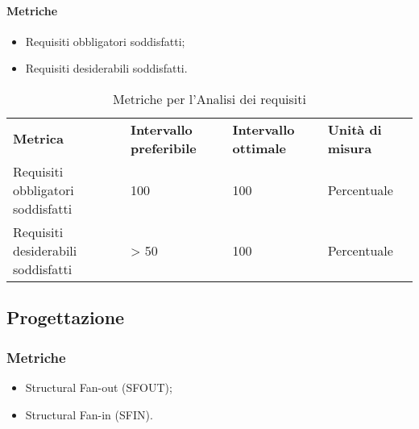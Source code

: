 \paragraph{Metriche}
\begin{itemize}
	\item Requisiti obbligatori soddisfatti;
	\item Requisiti desiderabili soddisfatti.
\end{itemize}
\renewcommand{\arraystretch}{2.2}
\begin{longtable}{|C{4.5cm}|C{2.25cm}|C{2.25cm}|C{3cm}|}

	\caption{Metriche per l'Analisi dei requisiti }\\
	\hline

	\textbf{Metrica} & \textbf{Intervallo preferibile}  & \textbf{Intervallo ottimale} & \textbf{Unità di misura}
	\tabularnewline
	\endfirsthead

	Requisiti obbligatori soddisfatti &  100 & 100 & Percentuale \\
	Requisiti desiderabili soddisfatti &  > 50 & 100 & Percentuale \\
\end{longtable}
\pagebreak


\subsection{Progettazione}

\subsubsection{Metriche}
\begin{itemize}
	\item Structural Fan-out (SFOUT);
	\item Structural Fan-in (SFIN).
\end{itemize}

